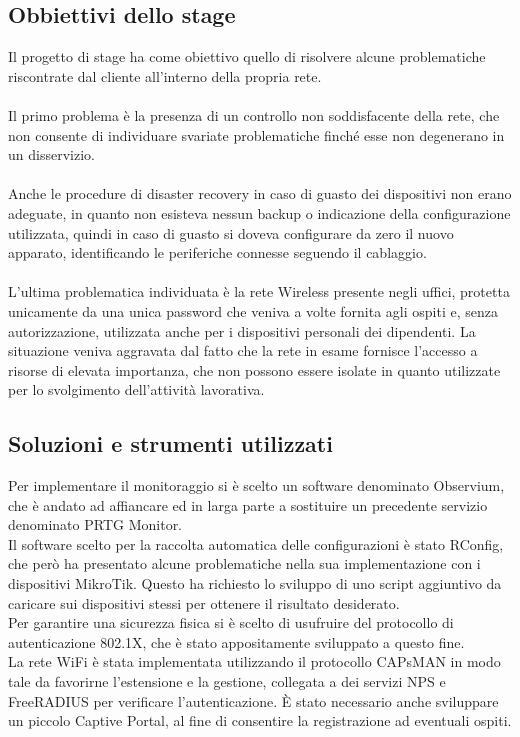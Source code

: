 \documentclass[Tesi.tex]{subfiles}
\begin{document}
\subsection{Obbiettivi dello stage}
Il progetto di stage ha come obiettivo quello di risolvere alcune problematiche riscontrate dal cliente all'interno della propria rete. \\\\
Il primo problema è la presenza di un controllo non soddisfacente della rete, che non consente di individuare svariate problematiche finché esse non degenerano in un disservizio. \\\\
Anche le procedure di disaster recovery in caso di guasto dei dispositivi non erano adeguate, in quanto non esisteva nessun backup o indicazione della configurazione utilizzata, quindi in caso di guasto si doveva configurare da zero il nuovo apparato, identificando le periferiche connesse seguendo il cablaggio.\\\\
L'ultima problematica individuata è la rete Wireless presente negli uffici, protetta unicamente da una unica password  che veniva a volte fornita agli ospiti e, senza autorizzazione, utilizzata anche per i dispositivi personali dei dipendenti. La situazione veniva aggravata dal fatto che la rete in esame fornisce l'accesso a risorse di elevata importanza, che non possono essere isolate in quanto utilizzate per lo svolgimento dell'attività lavorativa.

\subsection{Soluzioni e strumenti utilizzati}
Per implementare il monitoraggio si è scelto un software denominato Observium, che è andato ad affiancare ed in larga parte a sostituire un precedente servizio denominato PRTG Monitor. \\

Il software scelto per la raccolta automatica delle configurazioni è stato RConfig, che però ha presentato alcune problematiche nella sua implementazione con i dispositivi MikroTik. Questo ha richiesto lo sviluppo di uno script aggiuntivo da caricare sui dispositivi stessi per ottenere il risultato desiderato. \\

Per garantire una sicurezza fisica si è scelto di usufruire del protocollo di autenticazione 802.1X, che è stato appositamente sviluppato a questo fine.\\
La rete WiFi è stata implementata utilizzando il protocollo CAPsMAN in modo tale da favorirne l'estensione e la gestione, collegata a dei servizi NPS e FreeRADIUS per verificare l'autenticazione. \`{E} stato necessario anche sviluppare un piccolo Captive Portal, al fine di consentire la registrazione ad eventuali ospiti.
\end{document}
